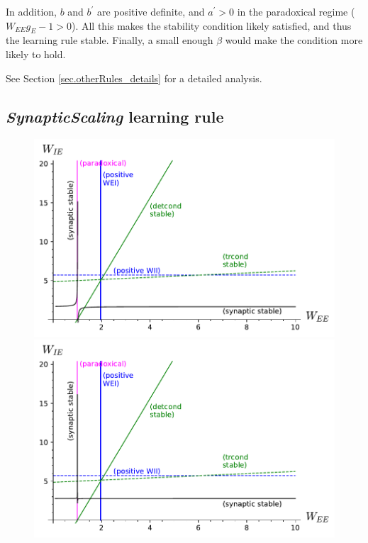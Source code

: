 \documentclass[twocolumn]{article}
\newcommand{\EE}{\mathit{EE}}
\begin{document}
\noindent In addition, $b$ and $b^\prime$ are positive definite, and $a^\prime>0$ in the paradoxical regime ($W_{\EE}g_E - 1 > 0$). All this makes the stability condition likely satisfied, and thus the learning rule stable. Finally, a small enough $\beta$ would make the condition more likely to hold.

See Section \ref{sec.otherRules_details} for a detailed analysis.



\subsection{{\em SynapticScaling} learning rule}


\begin{figure}[!ht]
\centering
\parbox[c]{\columnwidth}{
\includegraphics[width=\columnwidth]{SS_stability.pdf}
\includegraphics[width=\columnwidth]{SS_stability_slowExc.pdf}}

\end{figure}
\end{document}
